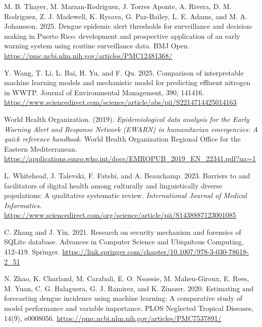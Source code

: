 \documentclass[
]{article}
\begin{document}
M. B. Thayer, M. Marzan-Rodriguez, J. Torres Aponte, A. Rivera, D. M.
Rodriguez, Z. J. Madewell, K. Rysava, G. Paz-Bailey, L. E. Adams, and M.
A. Johansson. 2025. Dengue epidemic alert thresholds for surveillance
and decision-making in Puerto Rico: development and prospective
application of an early warning system using routine surveillance data.
BMJ Open.
\href{https://pmc.ncbi.nlm.nih.gov/articles/PMC12481368/}{\ul{https://pmc.ncbi.nlm.nih.gov/articles/PMC12481368/}}

Y. Wang, T. Li, L. Bai, H. Yu, and F. Qu. 2025. Comparison of
interpretable machine learning models and mechanistic model for
predicting effluent nitrogen in WWTP. Journal of Environmental
Management, 390, 141416.
\href{https://www.sciencedirect.com/science/article/abs/pii/S2214714425014163}{\ul{https://www.sciencedirect.com/science/article/abs/pii/S2214714425014163}}

World Health Organization. (2019). \emph{Epidemiological data analysis
for the Early Warning Alert and Response Network (EWARN) in humanitarian
emergencies: A quick reference handbook}. World Health Organization
Regional Office for the Eastern Mediterranean.
\ul{\mbox{\url{https://applications.emro.who.int/docs/EMROPUB_2019_EN_22341.pdf?ua=1}}}

L. Whitehead, J. Talevski, F. Fatehi, and A. Beauchamp. 2023. Barriers
to and facilitators of digital health among culturally and
linguistically diverse populations: A qualitative systematic review.
\emph{International Journal of Medical Informatics}.
\href{https://www.sciencedirect.com/org/science/article/pii/S1438887123001085}{\ul{https://www.sciencedirect.com/org/science/article/pii/S1438887123001085}}

C. Zhang and J. Yin. 2021. Research on security mechanism and forensics
of SQLite database. Advances in Computer Science and Ubiquitous
Computing, 412-419. Springer.
\href{https://link.springer.com/chapter/10.1007/978-3-030-78618-2_51}{\ul{https://link.springer.com/chapter/10.1007/978-3-030-78618-2\_51}}

N. Zhao, K. Charland, M. Carabali, E. O. Nsoesie, M. Maheu-Giroux, E.
Rees, M. Yuan, C. G. Balaguera, G. J. Ramirez, and K. Zinszer. 2020.
Estimating and forecasting dengue incidence using machine learning: A
comparative study of model performance and variable importance. PLOS
Neglected Tropical Diseases, 14(9), e0008056.
\href{https://pmc.ncbi.nlm.nih.gov/articles/PMC7537891/}{\ul{https://pmc.ncbi.nlm.nih.gov/articles/PMC7537891/}}
\end{document}
